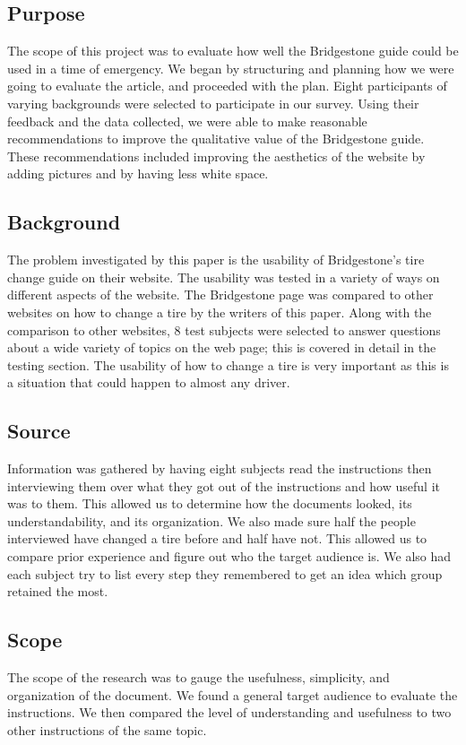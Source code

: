 \documentclass[12pt,A4paper]{article}
\begin{document}
		\subsection{Purpose}
		The scope of this project was to evaluate how well the Bridgestone guide could be used in a time of emergency. We began by structuring and planning how we were going to evaluate the article, and proceeded with the plan. Eight participants of varying backgrounds were selected to participate in our survey. Using their feedback and the data collected, we were able to make reasonable recommendations to improve the qualitative value of the Bridgestone guide. These recommendations included improving the aesthetics of the website by adding pictures and by having less white space. 
		\vspace{0.5 in}
		\subsection{Background}
		The problem investigated by this paper is the usability of Bridgestone’s tire change guide on their website. The usability was tested in a variety of ways on different aspects of the website. The Bridgestone page was compared to other websites on how to change a tire by the writers of this paper. Along with the comparison to other websites, 8 test subjects were selected to answer questions about a wide variety of topics on the web page; this is covered in detail in the testing section. The usability of how to change a tire is very important as this is a situation that could happen to almost any driver.  

		\subsection{Source}
		Information was gathered by having eight subjects read the instructions then interviewing them over what they got out of the instructions and how useful it was to them. This allowed us to determine how the documents looked, its understandability, and its organization. We also made sure half the people interviewed have changed a tire before and half have not. This allowed us to compare prior experience and figure out who the target audience is. We also had each subject try to list every step they remembered to get an idea which group retained the most. 

		\subsection{Scope}
		The scope of  the research was to gauge the usefulness, simplicity, and organization of the document. We found a general target audience to evaluate the instructions. We then compared the level of understanding and usefulness to two other instructions of the same topic.
\end{document}
